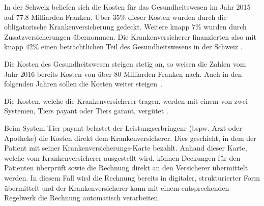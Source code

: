 \documentclass{hwz}
\begin{document}


In der Schweiz beliefen sich die Kosten für das Gesundheitswesen im Jahr 2015 auf 77.8 Milliarden Franken. Über 35\% dieser Kosten wurden durch die obligatorische Krankenversicherung gedeckt. Weitere knapp 7\% wurden durch Zusatzversicherungen übernommen. Die Krankenversicherer finanzierten also mit knapp 42\% einen beträchtlichen Teil des Gesundheitswesens in der Schweiz \autocite{BundesamtfurStatistik2018Finanzierung, BundesamtfurStatistik2017KostenDaten}.

Die Kosten des Gesundheitswesen steigen stetig an, so weisen die Zahlen vom Jahr 2016 bereits Kosten von über 80 Milliarden Franken nach. Auch in den folgenden Jahren sollen die Kosten weiter steigen~\autocite{BundesamtfurStatistik2018Finanzierung, Hehli2017GesundheitskostenWeiter}.

Die Kosten, welche die Krankenversicherer tragen, werden mit einem von zwei Systemen, Tiers payant oder Tiers garant, vergütet \autocite{EidgenossischesDepartementdesInnern2017FaktenblattVergutungssysteme}. 

Beim System Tier payant belastet der Leistungserbringenr (bspw. Arzt oder Apotheke) die Kosten direkt dem Krankenversicherer. Dies geschieht, in dem der Patient mit seiner Kranken\-versicherungs-Karte bezahlt. Anhand dieser Karte, welche vom Krankenversicherer ausgestellt wird, können Deckungen für den Patienten überprüft sowie die Rechnung direkt an den Versicherer übermittelt werden. In diesem Fall wird die Rechnung bereits in digitaler, strukturierter Form übermittelt und der Krankenversicherer kann mit einem entsprechenden Regelwerk die Rechnung automatisch verarbeiten. 
\end{document}
